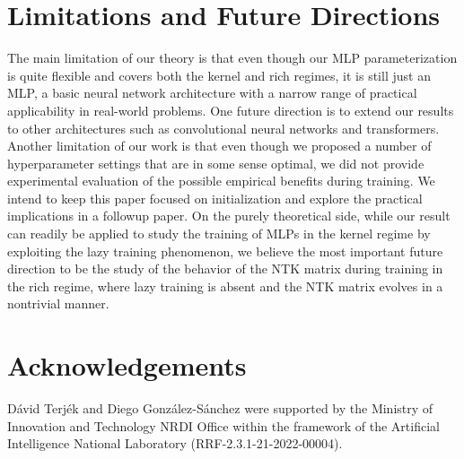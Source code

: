 \documentclass[twoside,11pt]{article}
\begin{document}
\section{Limitations and Future Directions} \label{limitations}
The main limitation of our theory is that even though our MLP parameterization is quite flexible and covers both the kernel and rich regimes, it is still just an MLP, a basic neural network architecture with a narrow range of practical applicability in real-world problems. One future direction is to extend our results to other architectures such as convolutional neural networks and transformers. Another limitation of our work is that even though we proposed a number of hyperparameter settings that are in some sense optimal, we did not provide experimental evaluation of the possible empirical benefits during training. We intend to keep this paper focused on initialization and explore the practical implications in a followup paper. On the purely theoretical side, while our result can readily be applied to study the training of MLPs in the kernel regime by exploiting the lazy training phenomenon, we believe the most important future direction to be the study of the behavior of the NTK matrix during training in the rich regime, where lazy training is absent and the NTK matrix evolves in a nontrivial manner.

\section*{Acknowledgements}
D\'avid Terj\'ek and Diego Gonz\'alez-S\'anchez were supported by the Ministry of Innovation and Technology NRDI Office within the framework of the Artificial Intelligence National Laboratory (RRF-2.3.1-21-2022-00004).

\newpage


\end{document}

